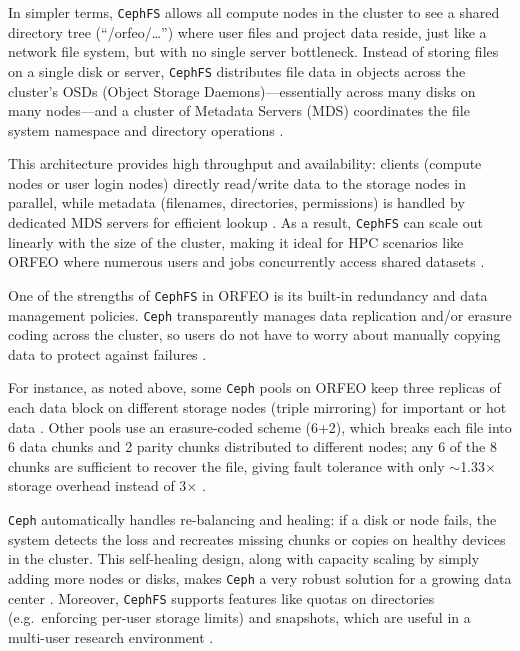 In simpler terms, \texttt{CephFS} allows all compute nodes in the cluster to 
see a shared directory tree (“/orfeo/\ldots”) where user files and project data 
reside, just like a network file system, but with no single server bottleneck. 
Instead of storing files on a single disk or server, \texttt{CephFS} distributes 
file data in objects across the cluster’s OSDs (Object Storage Daemons)—essentially 
across many disks on many nodes—and a cluster of Metadata Servers (MDS) 
coordinates the file system namespace and directory 
operations \parencite{CephFS,Ceph_RADOS,RedHat_CephFS}. 

This architecture provides high throughput and availability: clients (compute 
nodes or user login nodes) directly read/write data to the storage nodes in 
parallel, while metadata (filenames, directories, permissions) is handled by 
dedicated MDS servers for efficient lookup \parencite{CephFS,RedHat_CephFS}. As a 
result, \texttt{CephFS} can scale out linearly with the size of the cluster, 
making it ideal for HPC scenarios like ORFEO where numerous users and jobs 
concurrently access shared datasets \parencite{CephFS}.

\medskip

One of the strengths of \texttt{CephFS} in ORFEO is its built-in redundancy and 
data management policies. \texttt{Ceph} transparently manages data replication 
and/or erasure coding across the cluster, so users do not have to worry about 
manually copying data to protect against failures \parencite{Ceph_Pools,Ceph_EC}. 

For instance, as noted above, some \texttt{Ceph} pools on ORFEO keep three 
replicas of each data block on different storage nodes (triple mirroring) for 
important or hot data \parencite{Ceph_Pools}. Other pools use an erasure-coded 
scheme (6+2), which breaks each file into 6 data chunks and 2 parity chunks 
distributed to different nodes; any 6 of the 8 chunks are sufficient to recover 
the file, giving fault tolerance with only $\sim$1.33$\times$ storage overhead 
instead of 3$\times$ \parencite{Ceph_EC,Ceph_RADOS}. 

\texttt{Ceph} automatically handles re-balancing and healing: if a disk or node 
fails, the system detects the loss and recreates missing chunks or copies on 
healthy devices in the cluster. This self-healing design, along with capacity 
scaling by simply adding more nodes or disks, makes \texttt{Ceph} a very robust 
solution for a growing data center \parencite{Ceph_RADOS}. Moreover, 
\texttt{CephFS} supports features like quotas on directories (e.g.\ enforcing 
per-user storage limits) and snapshots, which are useful in a multi-user 
research environment \parencite{ORFEO_Docs_Storage}. 

